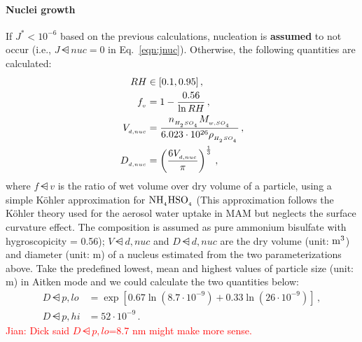 \paragraph{Nuclei growth} 
If $J^* < 10^{-6}$ based on the previous calculations, nucleation is
\textbf{assumed} to not occur (i.e., $J\dsub{nuc} = 0$ in Eq.~\eqref{eqn:jnuc}).
Otherwise, the following quantities are calculated:
%
\begin{align}
RH &\in [0.1, 0.95] \,, \\
f_{_{v}} &= 1 - \frac{0.56}{\ln RH} \,, \\
V_{_{d,nuc}} &= \frac{n_{_{H_{_2}SO_{_4}}} M_{_{w,SO_{_4}}}}
                          {6.023 \cdot 10^{26} \rho_{_{H_{_2}SO_{_4}}}} \,, \\
D_{_{d,nuc}} &= \left( \frac{6 V_{_{d,nuc}}}{\pi} \right)^{\frac{1}{3}} \,,
\end{align}
%
where $f\dsub{v}$ is the ratio of wet volume over dry volume of a particle,
using a simple K\"ohler approximation for $\rm NH_{_{4}}HSO_{_{4}}$
(This approximation follows the K\"ohler theory used for the aerosol water
uptake in MAM but neglects the surface curvature effect. The composition
is assumed as pure ammonium bisulfate with hygroscopicity = 0.56);
$V\dsub{d,nuc}$ and $D\dsub{d,nuc}$ are the dry volume (unit: $\rm m^3$)
and diameter (unit: m) of a nucleus estimated from the two parameterizations
above. Take the predefined lowest, mean and highest values of particle size
(unit: m) in Aitken mode and we could calculate the two quantities below:
\begin{align}
D\dsub{p,lo} &= \exp \left[ 0.67 \ln (8.7 \cdot 10^{-9}) +
                          0.33 \ln (26 \cdot 10^{-9}) \right] \,, \\   %
D\dsub{p,hi} &= 52 \cdot 10^{-9} \,.
\end{align}
\textcolor{red}{Jian: Dick said $D\dsub{p,lo}$=8.7 nm might make more sense.}

